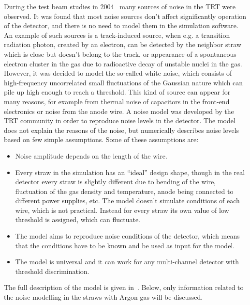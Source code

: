 During the test beam studies in 2004~\cite{trt_test_beam} many sources of noise in the TRT were observed.
It was found that most noise sources don't affect significantly operation of the detector, and there is no need to model them in the simulation software.
An example of such sources is a track-induced source, when e.g. a transition radiation photon, created by an electron, can be detected by the neighbor straw which is close 
but doesn't belong to the track, or appearance of a spontaneous electron cluster in the gas due to radioactive decay of unstable nuclei in the gas.
However, it was decided to model the so-called white noise, which consists of high-frequency uncorrelated small fluctuations of the Gaussian nature which 
can pile up high enough to reach a threshold. This kind of source can appear for many reasons, for example from thermal noise of capacitors in the front-end electronics
or noise from the anode wire. A noise model was developed by the TRT community in order to reproduce noise levels in the detector.
The model does not explain the reasons of the noise, but numerically describes noise levels based on few simple assumptions.
Some of these assumptions are:
\begin{itemize}
 \item Noise amplitude depends on the length of the wire.
 \item Every straw in the simulation has an ``ideal'' design shape, though in the real detector every straw is slightly different due to bending of the wire, 
 fluctuation of the gas  density and temperature, anode being connected to different power supplies, etc. The model doesn't simulate conditions of each wire, 
 which is not practical. 
 Instead for every straw its own value of low threshold is assigned, which can fluctuate.
 \item The model aims to reproduce noise conditions of the detector, which means that the conditions have to be known and be used as input for the model.
 \item The model is universal and it can work for any multi-channel detector with threshold discrimination.
\end{itemize}
The full description of the model is given in~\cite{kittelmann_thesis}. 
Below, only information related to the noise modelling in the straws with Argon gas will be discussed.

